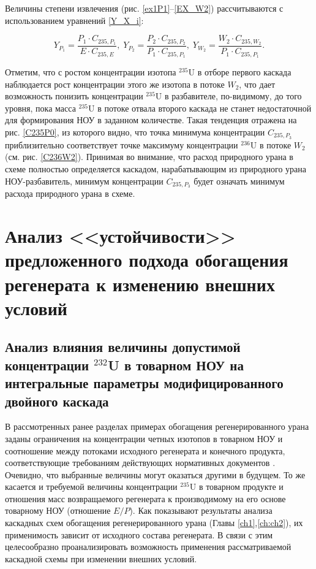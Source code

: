 Величины степени извлечения (рис. \ref{ex1P1}--\ref{EX_W2}) рассчитываются с использованием уравнений \ref{Y_X_i}: 

\begin{equation}\label{Y_X_i}
    Y_{P_1} = \frac{P_1 \cdot C_{235,{P_1}}}{E \cdot C_{235,{E}}} ,\; 
    Y_{P_2} = \frac{P_2 \cdot C_{235,{P_2}}}{P_1 \cdot C_{235,{P_1}}} ,\; 
    Y_{W_2} = \frac{W_2 \cdot C_{235,{W_2}}}{P_1 \cdot C_{235,{P_1}}}.
\end{equation}

Отметим, что с ростом концентрации изотопа $^{235}$U в отборе первого каскада наблюдается рост концентрации этого же изотопа в потоке $W_2$, что дает возможность понизить концентрации $^{235}$U в разбавителе, по-видимому, до того уровня, пока масса $^{235}$U в потоке отвала второго каскада не станет недостаточной для формирования НОУ в заданном количестве. Такая тенденция отражена на рис. \ref{C235P0}, из которого видно, что точка минимума концентрации $C_{235,{P_3}}$ приблизительно соответствует точке максимуму концентрации $^{236}$U в потоке $W_2$ (см. рис. \ref{C236W2}). Принимая во внимание, что расход природного урана в схеме полностью определяется каскадом, нарабатывающим из природного урана НОУ-разбавитель, минимум концентрации $C_{235,{P_3}}$ будет означать минимум расхода природного урана в схеме.


\section{Анализ <<устойчивости>> предложенного подхода обогащения регенерата к изменению внешних условий}
\subsection{Анализ влияния величины допустимой концентрации $^{232}$U в товарном НОУ на интегральные параметры модифицированного двойного каскада}

В рассмотренных ранее разделах примерах обогащения регенерированного урана заданы ограничения на концентрации четных изотопов в товарном НОУ и соотношение между потоками исходного регенерата и конечного продукта, соответствующие требованиям действующих нормативных документов  \cite{smirnovEvolutionIsotopicComposition2012,smirnovKaskadnyeShemyZadachah2012}. Очевидно, что выбранные величины могут оказаться другими в будущем. То же касается и требуемой величины концентрации $^{235}$U в товарном продукте и отношения масс возвращаемого регенерата к производимому на его основе товарному НОУ (отношение $E/P$). Как показывают результаты анализа каскадных схем обогащения регенерированного урана (Главы \ref{ch1},\ref{ch:ch2}), их применимость зависит от исходного состава регенерата. В связи с этим целесообразно проанализировать возможность применения рассматриваемой каскадной схемы при изменении внешних условий.

